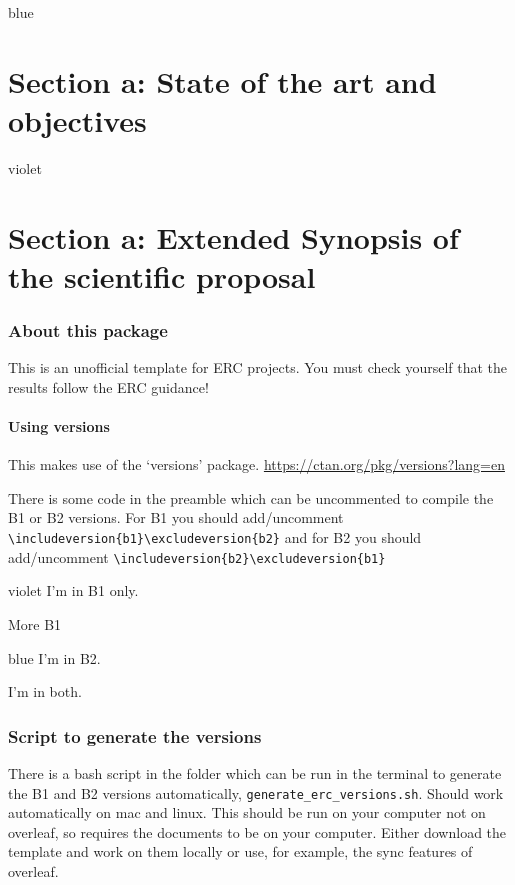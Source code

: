 \documentclass[11pt,a4paper]{article}
\newenvironment{b1}{\begin{color}{violet}}{\end{color}}
\newenvironment{b2}{\begin{color}{blue}}{\end{color}}
\begin{document}
\begin{b2}
	\part{Section a: State of the art and objectives}
\end{b2}
\begin{b1}
	\part{Section a: Extended Synopsis of the scientific proposal}
\end{b1}


\section*{About this package}

This is an unofficial template for ERC projects. You must check yourself that the results follow the ERC guidance!



\subsection*{Using versions}

This makes use of the `versions' package. \url{https://ctan.org/pkg/versions?lang=en}

There is some code in the preamble which can be uncommented to compile the B1 or B2 versions. 
For B1 you should add/uncomment \verb*|\includeversion{b1}\excludeversion{b2}| and for B2 you should add/uncomment \verb*|\includeversion{b2}\excludeversion{b1}|


\begin{b1}
I'm in B1 only.

More B1
\end{b1}

\begin{b2}
I'm in B2.
\end{b2}

I'm in both. 



\section*{Script to generate the versions}

There is a bash script in the folder which can be run in the terminal to generate the B1 and B2 versions automatically, \verb|generate_erc_versions.sh|. Should work automatically on mac and linux. This should be run on your computer not on overleaf, so requires the documents to be on your computer. Either download the template and work on them locally or use, for example, the sync features of overleaf. 
\end{document}
